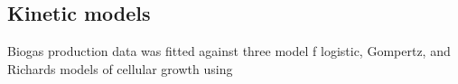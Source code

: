 \subsection{Kinetic models}
Biogas production data was fitted against three model f logistic, Gompertz, and
Richards models of cellular growth using  